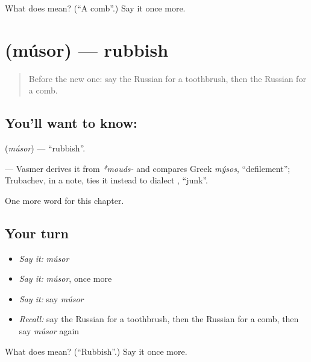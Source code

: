 \begin{tcolorbox}[breakable,colback=teal!4,colframe=teal!35!black,title={Before you move on}]
What does  mean? (\textquotedblleft{}A comb\textquotedblright{}.) Say it once more.
\end{tcolorbox}
\section[\texorpdfstring{\ru{мусор} (músor)}{мусор (músor)}]{ (músor) — rubbish}

\label{lesson:RU-C96-rubbish}



\begin{quote}
Before the new one: say the Russian for a toothbrush, then the Russian for a comb.
\end{quote}

\subsection*{You'll want to know: }
\textbf{} (\emph{músor}) — \textquotedblleft{}rubbish\textquotedblright{}.

\begin{cousinweb}
\textbf{} — Vasmer derives it from \emph{*mouds-} and compares Greek \emph{mýsos}, \textquotedblleft{}defilement\textquotedblright{}; Trubachev, in a note, ties it instead to dialect \emph{}, \textquotedblleft{}junk\textquotedblright{}.
\end{cousinweb}

\begin{grammarlens}[title={What you've built}]
One more word for this chapter.
\end{grammarlens}

\subsection*{Your turn}
\begin{itemize}
\raggedright
  \item \emph{Say it:} \emph{músor}
  \item \emph{Say it:} \emph{músor}, once more
  \item \emph{Say it:} say \emph{músor}
  \item \emph{Recall:} say the Russian for a toothbrush, then the Russian for a comb, then say \emph{músor} again
\end{itemize}

\begin{tcolorbox}[breakable,colback=teal!4,colframe=teal!35!black,title={Before you move on}]
What does  mean? (\textquotedblleft{}Rubbish\textquotedblright{}.) Say it once more.
\end{tcolorbox}
